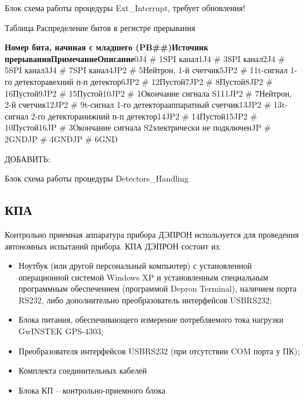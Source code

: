 \documentclass[a4paper,portrait,12pt]{article}
\begin{document}
{{{{Блок схема работы процедуры Ext\_Interrupt, \colorbox[rgb]{1.000,0.000,0.000}{требует обновления!}





Таблица Распределение битов в регистре прерывания


\textbf{Номер бита, начиная с младшего (PB\#\#)Источник прерыванияПримечаниеОписание}0J4 \# 1SPI канал1J4 \# 3SPI канал2J4 \# 5SPI канал3J4 \# 7SPI канал4JP2 \# 5Нейтрон, 1-й счетчик5JP2 \# 11t-сигнал 1-го детекторавехний п-п детектор6JP2 \# 12Пустой7JP2 \# 8Пустой8JP2 \# 16Пустой9JP2 \# 15Пустой10JP2 \# 1Окончание сигнала S111JP2 \# 7Нейтрон, 2-й счетчик12JP2 \# 9t-сигнал 1-го детекторааппаратный счетчик13JP2 \# 13t-сигнал 2-го детекторанижний п-п детектор14JP2 \# 14Пустой15JP2 \# 10Пустой16JP \# 3Окончание сигнала S2электрически не подключенJP \# 2GNDJP \# 4GNDJP \# 6GND








\colorbox[rgb]{1.000,0.000,0.000}{ДОБАВИТЬ:}


Блок схема работы процедуры Detectors\_Handling





\subsection*{	\textbf{ }\textbf{КПА}}

Контрольно приемная аппаратура прибора ДЭПРОН используется для  проведения автономных испытаний прибора. КПА ДЭПРОН состоит из:


\begin{itemize}
\item 	Ноутбук (или другой персональный компьютер) с установленной операционной системой Windows XP и установленным специальным программным обеспечением (программой Depron Terminal), наличием порта RS232, либо дополнительно преобразователь интерфейсов USBRS232;


\item 	Блока питания, обеспечивающего измерение потребляемого тока нагрузки GwINSTEK GPS-4303;


\item 	Преобразователя интерфейсов USBRS232 (при отсутствии COM порта у ПК);


\item 	Комплекта соединительных кабелей 


\item 	Блока КП -- контрольно-приемного блока



\end{itemize}}}}}
\end{document}
